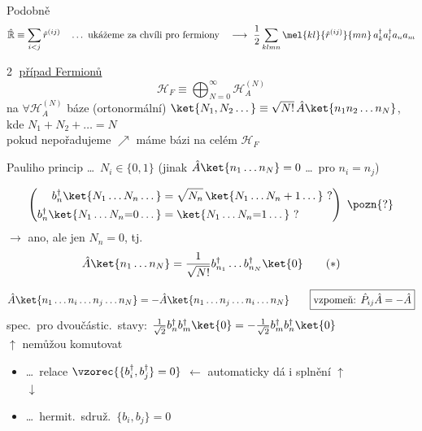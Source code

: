 Podobně 
\[
  \hat{\mathbb{R}} \equiv \sum_{i<j}\hat r^{(ij)}
  \quad\dots\ \text{ukážeme za chvíli pro fermiony}\quad
  \longrightarrow\ \frac12\sum_{klmn}\mel{kl}{\hat r^{(ij)}}{mn}\,a_k^\dagger a_l^\dagger a_n a_m
\]

\textcircled{2} \underline{případ Fermionů}
\[
  \mathcal{H}_F \equiv \bigoplus_{N=0}^{\infty}\mathcal{H}_A^{(N)}
\]
na $\forall\mathcal{H}_A^{(N)}$ báze (ortonormální) \quad $\ket{N_1,N_2\dots} \equiv \sqrt{N!}\,\hat A\ket{n_1n_2\dots n_N}$, \\
\hspace*{7.5cm} kde $N_1 + N_2 + \dots = N$ \\
pokud nepořadujeme $\nearrow$ máme bázi na celém $\mathcal{H}_F$

Pauliho princip \dots\ $N_i\in\{0,1\}$ \quad (jinak $\hat A\ket{n_1\dots n_N} = 0$ \dots\ pro $n_i = n_j$)

\begin{definice}
\[
  \left(\begin{aligned}
    b_n^\dagger\ket{N_1\dots N_n\dots} &= \sqrt{N_n}\,\ket{N_1\dots N_n+1\dots}\ ? \\
    b_n^\dagger\ket{N_1\dots N_n{=}0\dots} &= \ket{N_1\dots N_n{=}1\dots}\ ?
  \end{aligned}\right)\ \pozn{?}
\]
$\to$ ano, ale jen $N_n = 0$, tj.
\[
  \hat A\ket{n_1\dots n_N} = \frac{1}{\sqrt{N!}}b_{n_1}^\dagger\dots b_{n_N}^\dagger\ket{0} \qquad (*)
\]
\end{definice}
\[
  \hat A\ket{n_1\dots n_i\dots n_j\dots n_N} = -\hat A\ket{n_1\dots n_j\dots n_i\dots n_N}
  \qquad \boxed{\text{vzpomeň: } \hat P_{ij}\hat A = -\hat A}
\]
spec.\ pro dvoučástic.\ stavy: \quad
$\frac{1}{\sqrt2}b_n^\dagger b_m^\dagger\ket{0} = -\frac{1}{\sqrt2}b_m^\dagger b_n^\dagger\ket{0}$ \\
\hspace*{6cm} $\uparrow$ nemůžou komutovat
\begin{itemize}
  \item \dots\ relace \quad $\vzorec{\{b_i^\dagger,b_j^\dagger\} = 0}$ \quad $\leftarrow$ automaticky dá i splnění $\uparrow$ \\
        \hspace*{2.2cm} $\downarrow$
  \item \dots\ hermit.\ sdruž.\ \quad $\{b_i,b_j\} = 0$
\end{itemize}

